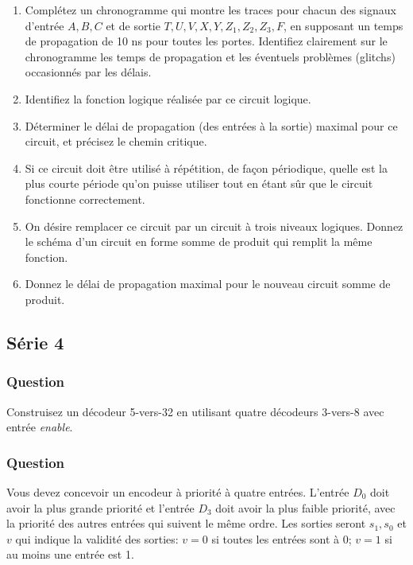 \documentclass[11pt]{article}
\begin{document}
\begin{enumerate}
\item Complétez un chronogramme qui montre les traces pour chacun des
signaux d'entrée \(A, B, C\) et de sortie \(T, U, V, X, Y, Z_1,
       Z_2, Z_3, F\), en supposant un temps de propagation de 10 ns
pour toutes les portes. Identifiez clairement sur le
chronogramme les temps de propagation et les éventuels problèmes
(glitchs) occasionnés par les délais.

\item Identifiez la fonction logique réalisée par ce circuit logique.

\item Déterminer le délai de propagation (des entrées à la sortie)
maximal pour ce circuit, et précisez le chemin critique.

\item Si ce circuit doit être utilisé à répétition, de façon périodique,
quelle est la plus courte période qu'on puisse utiliser tout en
étant sûr que le circuit fonctionne correctement.

\item On désire remplacer ce circuit par un circuit à trois niveaux
logiques. Donnez le schéma d'un circuit en forme somme de produit
qui remplit la même fonction.

\item Donnez le délai de propagation maximal pour le nouveau circuit
somme de produit.
\end{enumerate}

\subsection*{Série 4}
\label{sec:org2da2619}
\subsubsection*{Question}
\label{sec:orgd0637b0}
Construisez un décodeur 5-vers-32 en utilisant quatre décodeurs
  3-vers-8 avec entrée \emph{enable}.

\subsubsection*{Question}
\label{sec:org716451b}
Vous devez concevoir un encodeur à priorité à quatre
  entrées. L'entrée \(D_0\) doit avoir la plus grande priorité et
  l'entrée \(D_3\) doit avoir la plus faible priorité, avec la
  priorité des autres entrées qui suivent le même ordre. Les sorties
  seront \(s_1, s_0\) et \(v\) qui indique la validité des sorties:
  \(v=0\) si toutes les entrées sont à 0; \(v=1\) si au moins une
  entrée est 1.
\end{document}
